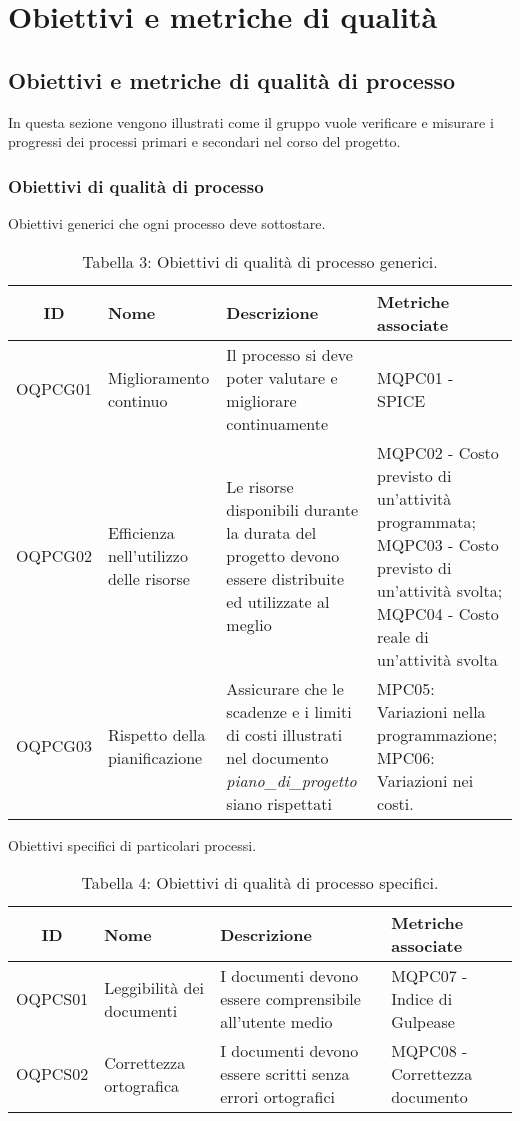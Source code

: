 \section{Obiettivi e metriche di qualità}
\subsection{Obiettivi e metriche di qualità di processo}
In questa sezione vengono illustrati come il gruppo vuole verificare e misurare i progressi dei processi primari e secondari nel corso del progetto.
\subsubsection{Obiettivi di qualità di processo}
Obiettivi generici che ogni processo deve sottostare.
\begin{table}[H]
	\centering
	\begin{tabularx}{\textwidth}{|c|X|X|X|}
	\hline
	\textbf{ID} & \textbf{Nome} & \textbf{Descrizione} & \textbf{Metriche associate}\\
	\hline
	OQPCG01 & Miglioramento continuo & Il processo si deve poter valutare e migliorare continuamente & MQPC01 - SPICE\\
	\hline
	OQPCG02 & Efficienza nell'utilizzo delle risorse & Le risorse disponibili durante la durata del progetto devono essere distribuite ed utilizzate al meglio & MQPC02 - Costo previsto di un'attività programmata; \hspace{25pt} MQPC03 - Costo previsto di un'attività svolta; MQPC04 - Costo reale di un'attività svolta \\
	\hline
	OQPCG03 & Rispetto della pianificazione & Assicurare che le scadenze e i limiti di costi illustrati nel documento \textit{piano\_di\_progetto} siano rispettati &  MPC05: Variazioni nella programmazione;\hspace{65pt} MPC06: Variazioni nei costi. \\
	\hline
	\end{tabularx}
	\caption{Tabella 3: Obiettivi di qualità di processo generici.}
\end{table}
Obiettivi specifici di particolari processi.

\begin{table}[H]
	\centering
	\begin{tabularx}{\textwidth}{|c|X|X|X|}
		\hline
		\textbf{ID} & \textbf{Nome} & \textbf{Descrizione} & \textbf{Metriche associate}\\
		\hline
		OQPCS01 & Leggibilità dei documenti & I documenti devono essere comprensibile all'utente medio & MQPC07 - Indice di Gulpease\\
		\hline
		OQPCS02 & Correttezza ortografica & I documenti devono essere scritti senza errori ortografici & MQPC08 - Correttezza documento \\
		\hline
	\end{tabularx}
	\caption{Tabella 4: Obiettivi di qualità di processo specifici.}
\end{table}

